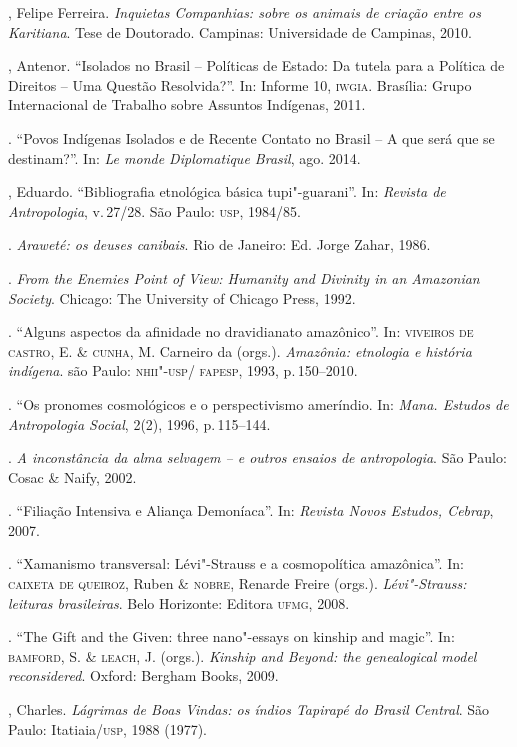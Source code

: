 \begin{bibliohedra}
, Felipe Ferreira. \emph{Inquietas Companhias: sobre os animais de criação entre os Karitiana}. Tese de Doutorado. Campinas: Universidade de
Campinas, 2010.

, Antenor. ``Isolados no Brasil -- Políticas de Estado: Da tutela
para a Política de Direitos -- Uma Questão Resolvida?''. In: Informe 10,
\textsc{iwgia}. Brasília: Grupo Internacional de Trabalho sobre Assuntos
Indígenas, 2011.

\titidem. ``Povos Indígenas Isolados e de Recente Contato no Brasil
-- A que será que se destinam?''. In: \emph{Le monde Diplomatique Brasil}, ago. 2014.

, Eduardo. ``Bibliografia etnológica básica tupi"-guarani''. In:
\emph{Revista de Antropologia}, v.\,27/28. São Paulo: \textsc{usp}, 1984/85.

\titidem. \emph{Araweté: os deuses canibais}. Rio de Janeiro: Ed. Jorge
Zahar, 1986.

\titidem. \emph{From the Enemies Point of View: Humanity and
Divinity in an Amazonian Society}. Chicago: The University of Chicago
Press, 1992.

\titidem. ``Alguns aspectos da afinidade no dravidianato amazônico''.
In: \textsc{viveiros de castro}, E. \& \textsc{cunha}, M. Carneiro da (orgs.). \emph{Amazônia: etnologia e história indígena}. são Paulo: \textsc{nhii}"-\textsc{usp}/ \textsc{fapesp}, 1993, p.\,150--2010.

\titidem. ``Os pronomes cosmológicos e o perspectivismo ameríndio.
In: \emph{Mana. Estudos de Antropologia Social}, 2(2), 1996, p.\,115--144.

\titidem. \emph{A inconstância da alma selvagem -- e outros ensaios
de antropologia}. São Paulo: Cosac \& Naify, 2002.

\titidem. ``Filiação Intensiva e Aliança Demoníaca''. In:
\emph{Revista Novos Estudos, Cebrap}, 2007.

\titidem. ``Xamanismo transversal: Lévi"-Strauss e a cosmopolítica
amazônica''. In: \textsc{caixeta de queiroz}, Ruben \& \textsc{nobre}, Renarde Freire
(orgs.). \emph{Lévi"-Strauss: leituras brasileiras}. Belo Horizonte:
Editora \textsc{ufmg}, 2008.

\titidem. ``The Gift and the Given: three nano"-essays on kinship
and magic''. In: \textsc{bamford}, S. \& \textsc{leach}, J. (orgs.). \emph{Kinship and Beyond: the genealogical model reconsidered}. Oxford: Bergham Books, 2009.

, Charles. \emph{Lágrimas de Boas Vindas: os índios Tapirapé
do Brasil Central}. São Paulo: Itatiaia/\textsc{usp}, 1988 (1977).


\end{bibliohedra}
